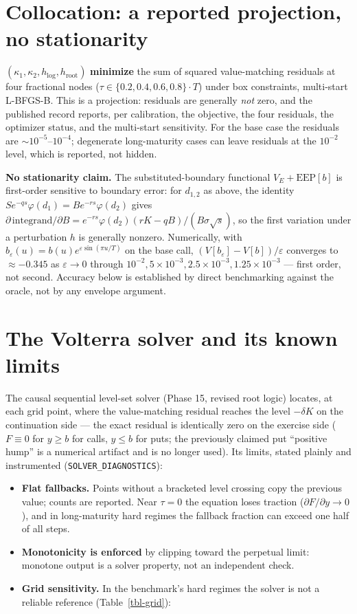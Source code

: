 \documentclass[
  english,
  10pt,
  letterpaper,
  DIV=11,
  numbers=noendperiod]{scrartcl}
\providecommand{\tightlist}{%
  \setlength{\itemsep}{0pt}\setlength{\parskip}{0pt}}
\begin{document}
\section{Collocation: a reported projection, no
stationarity}\label{sec-collocation}

\((\kappa_1,\kappa_2,h_{\log},h_{\mathrm{root}})\) \textbf{minimize} the
sum of squared value-matching residuals at four fractional nodes
(\(\tau\in\{0.2,0.4,0.6,0.8\}\cdot T\)) under box constraints,
multi-start L-BFGS-B. This is a projection: residuals are generally
\emph{not} zero, and the published record reports, per calibration, the
objective, the four residuals, the optimizer status, and the multi-start
sensitivity. For the base case the residuals are
\(\sim10^{-5}\)--\(10^{-4}\); degenerate long-maturity cases can leave
residuals at the \(10^{-2}\) level, which is reported, not hidden.

\textbf{No stationarity claim.} The substituted-boundary functional
\(V_E+\mathrm{EEP}[b]\) is first-order sensitive to boundary error: for
\(d_{1,2}\) as above, the identity
\(Se^{-qs}\varphi(d_1)=Be^{-rs}\varphi(d_2)\) gives
\(\partial\,\mathrm{integrand}/\partial B
=e^{-rs}\varphi(d_2)(rK-qB)/(B\sigma\sqrt s)\), so the first variation
under a perturbation \(h\) is generally nonzero. Numerically, with
\(b_\varepsilon(u)=b(u)e^{\varepsilon\sin(\pi u/T)}\) on the base call,
\((V[b_\varepsilon]-V[b])/\varepsilon\) converges to \(\approx-0.345\)
as \(\varepsilon\to0\) through
\(10^{-2},5\times10^{-3},2.5\times10^{-3},
1.25\times10^{-3}\) --- first order, not second. Accuracy below is
established by direct benchmarking against the oracle, not by any
envelope argument.

\section{The Volterra solver and its known limits}\label{sec-solver}

The causal sequential level-set solver (Phase 15, revised root logic)
locates, at each grid point, where the value-matching residual reaches
the level \(-\delta K\) on the continuation side --- the exact residual
is identically zero on the exercise side (\(F\equiv0\) for \(y\ge b\)
for calls, \(y\le b\) for puts; the previously claimed put ``positive
hump'' is a numerical artifact and is no longer used). Its limits,
stated plainly and instrumented (\texttt{SOLVER\_DIAGNOSTICS}):

\begin{itemize}
\tightlist
\item
  \textbf{Flat fallbacks.} Points without a bracketed level crossing
  copy the previous value; counts are reported. Near \(\tau=0\) the
  equation loses traction (\(\partial F/\partial y\to0\)), and in
  long-maturity hard regimes the fallback fraction can exceed one half
  of all steps.
\item
  \textbf{Monotonicity is enforced} by clipping toward the perpetual
  limit: monotone output is a solver property, not an independent check.
\item
  \textbf{Grid sensitivity.} In the benchmark's hard regimes the solver
  is not a reliable reference (Table~\ref{tbl-grid}):
\end{itemize}
\end{document}

